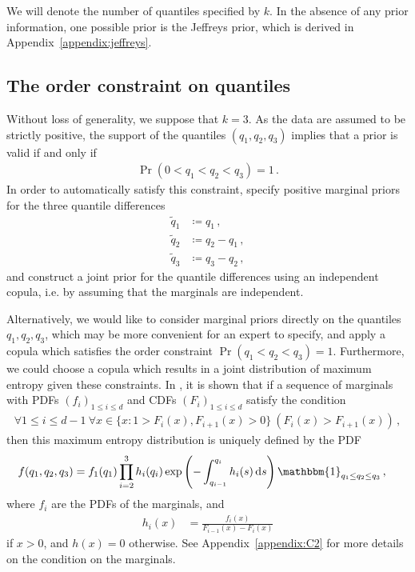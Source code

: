 \documentclass{article}
\newcommand{\dd}{{\rm d}}
\begin{document}
%
We will denote the number of quantiles specified by $k$.
In the absence of any prior information,
one possible prior is the Jeffreys prior, which is derived in
Appendix~\ref{appendix:jeffreys}.
%
\subsection{The order constraint on quantiles}
\label{section:order}
%
Without loss of generality, we suppose that $k = 3$.
As the data are assumed to be strictly positive,
the support of the quantiles $(q_1, q_2, q_3)$
implies that a prior is valid if and only if
%
\begin{align*}
	\Pr(0 < q_1 < q_2 < q_3) = 1 \,.
\end{align*}
%
In order to automatically satisfy this constraint,
\cite{coles1996} specify positive marginal priors
for the three quantile differences
%
\begin{align*}
	\tilde{q}_1 &\coloneqq q_1 \,,\\
	\tilde{q}_2 &\coloneqq q_2 - q_1 \,,\\
	\tilde{q}_3 &\coloneqq q_3 - q_2 \,,
\end{align*}
%
and construct a joint prior for the quantile differences
using an independent copula, i.e.
by assuming that the marginals are independent.
%

%
Alternatively, we would like to consider
marginal priors directly on the quantiles
$q_1, q_2, q_3$, which may be more convenient for an expert to specify,
and apply a copula which satisfies the order constraint
$\Pr(q_1 < q_2 < q_3) = 1$. 
Furthermore, we could choose a copula
which results in a joint distribution
of maximum entropy given these constraints.
In \cite{butucea2018}, it is shown that
if a sequence of marginals with PDFs $(f_i)_{1 \leq i \leq d}$
and CDFs $(F_i)_{1 \leq i \leq d}$
satisfy the condition
%
\begin{align}
	\forall 1 \leq i \leq d - 1
		\ \forall x \in \{x \colon 1 > F_i(x), F_{i + 1}(x) > 0\}
		\ (F_i(x) > F_{i + 1}(x))\,,
	\label{eq:C2}
\end{align}
%
then this maximum entropy distribution is uniquely defined
by the PDF
%
\begin{align}
	f(q_1, q_2, q_3) &= f_1(q_1) \prod_{i=2}^3 h_i(q_i)
		\exp\left(-\int_{q_{i - 1}}^{q_i} h_i(s) \, \dd s\right)
		\mathbbm{1}_{q_1 \leq q_2 \leq q_3} \,,
	\label{eq:max-ent-pdf}
\end{align}
%
where $f_i$ are the PDFs of the marginals, and
%
\begin{align*}
	h_i(x) &= \frac{f_i(x)}{F_{i - 1}(x) - F_i(x)}
\end{align*}
%
if $x > 0$, and $h(x) = 0$ otherwise.
See Appendix~\ref{appendix:C2} for more details
on the condition on the marginals.
\end{document}
